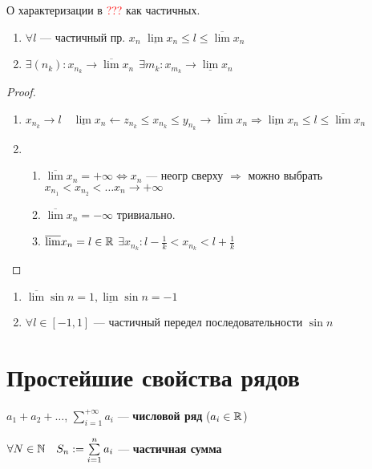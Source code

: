 \begin{theorem}
    О характеризации в \textcolor{red}{???} как частичных.

    \begin{enumerate}
        \item $\forall l$ --- частичный пр. $x_n$ $\underline \lim x_n \leq l \leq \overline \lim x_n$
        \item $\exists (n_k) : x_{n_k} \to \overline \lim x_n \ \ \exists m_k : x_{m_k}\to \underline \lim x_n$
    \end{enumerate}
\end{theorem}
\begin{proof}
    \begin{enumerate}
        \item $x_{n_k}\to l \quad \underline \lim x_n \leftarrow z_{n_k} \leq x_{n_k} \leq y_{n_k}\to \overline \lim x_n \Rightarrow \underline \lim x_n \leq l \leq \overline \lim x_n$
        \item \begin{enumerate}
            \item $\overline \lim x_n = +\infty \Leftrightarrow x_n$ --- неогр сверху $\Rightarrow$ можно выбрать $x_{n_1}<x_{n_2}<\ldots x_n\to+\infty$
            \item $\overline \lim x_n = -\infty$ тривиально.
            \item $\overline \lim x_n = l\in\mathbb{R}$ $\exists x_{n_k} : l - \frac{1}{k} < x_{n_k} < l + \frac{1}{k}$
        \end{enumerate}
    \end{enumerate}
\end{proof}

\begin{example}
    \begin{enumerate}
        \item $\overline \lim \sin n = 1, \underline \lim \sin n = -1$
        \item $\forall l \in [-1, 1]$ --- частичный передел последовательности $\sin n$
    \end{enumerate}
\end{example}

\section{Простейшие свойства рядов}

\begin{definition}
    $a_1+a_2+\ldots $, $\sum\limits_{i=1}^{+\infty} a_i$ --- \textbf{числовой ряд} ($a_i\in\mathbb{R}$)
\end{definition}
\begin{definition}
    $\forall N\in\mathbb{N} \quad S_n:=\sum\limits_{i=1}^n a_i$ --- \textbf{частичная сумма}
\end{definition}

